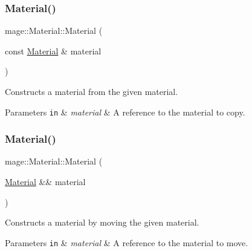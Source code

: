 \subsubsection{\texorpdfstring{Material()}{Material()}\hspace{0.1cm}{\footnotesize\ttfamily [2/3]}}
{\footnotesize\ttfamily mage\+::\+Material\+::\+Material (\begin{DoxyParamCaption}\item[{const \hyperlink{structmage_1_1_material}{Material} \&}]{material }\end{DoxyParamCaption})\hspace{0.3cm}{\ttfamily [default]}}

Constructs a material from the given material.


\begin{DoxyParams}[1]{Parameters}
\mbox{\tt in}  & {\em material} & A reference to the material to copy. \\
\hline
\end{DoxyParams}
\hypertarget{structmage_1_1_material_a41bfbc2bfa16e3694ac443d390b804c2}{}\label{structmage_1_1_material_a41bfbc2bfa16e3694ac443d390b804c2} 
\subsubsection{\texorpdfstring{Material()}{Material()}\hspace{0.1cm}{\footnotesize\ttfamily [3/3]}}
{\footnotesize\ttfamily mage\+::\+Material\+::\+Material (\begin{DoxyParamCaption}\item[{\hyperlink{structmage_1_1_material}{Material} \&\&}]{material }\end{DoxyParamCaption})\hspace{0.3cm}{\ttfamily [default]}}

Constructs a material by moving the given material.


\begin{DoxyParams}[1]{Parameters}
\mbox{\tt in}  & {\em material} & A reference to the material to move. \\
\hline
\end{DoxyParams}
\hypertarget{structmage_1_1_material_a4ca65b7e24144ee08dd1ce8d0eda9284}{}\label{structmage_1_1_material_a4ca65b7e24144ee08dd1ce8d0eda9284} 
